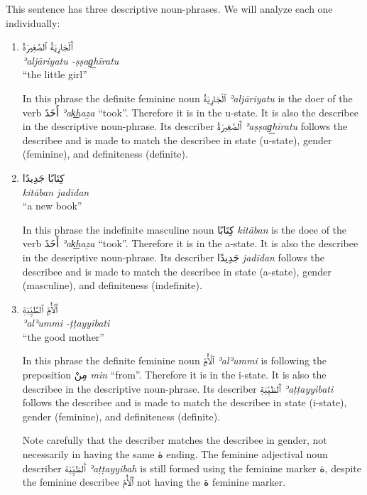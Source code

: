 \documentclass[
  10pt,
]{book}
\begin{document}
This sentence has three descriptive noun-phrases. We will analyze each one individually:

\begin{enumerate}
\def\labelenumi{\roman{enumi}.}
\item
  \foreignlanguage{arabic}{ٱَلْجَارِيَةُ ٱلصَّغِيرَةُ}\\
  \emph{ʾaljāriyatu -ṣṣag͟hīratu}\\
  \enquote{the little girl}

  In this phrase the definite feminine noun \foreignlanguage{arabic}{ٱلْجَارِيَةُ} \emph{ʾaljāriyatu} is the doer of the verb \foreignlanguage{arabic}{أَخَذَ} \emph{ʾak͟haẕa} \enquote{took}. Therefore it is in the u-state. It is also the describee in the descriptive noun-phrase. Its describer \foreignlanguage{arabic}{ٱَلصَّغِيرَةُ} \emph{ʾaṣṣag͟hīratu} follows the describee and is made to match the describee in state (u-state), gender (feminine), and definiteness (definite).
\item
  \foreignlanguage{arabic}{کِتَابًا جَدِيدًا}\\
  \emph{kitāban jadīdan}\\
  \enquote{a new book}

  In this phrase the indefinite masculine noun \foreignlanguage{arabic}{کِتَابًا} \emph{kitāban} is the doee of the verb \foreignlanguage{arabic}{أَخَذَ} \emph{ʾak͟haẕa} \enquote{took}. Therefore it is in the a-state. It is also the describee in the descriptive noun-phrase. Its describer \foreignlanguage{arabic}{جَدِيدًا} \emph{jadīdan} follows the describee and is made to match the describee in state (a-state), gender (masculine), and definiteness (indefinite).
\item
  \foreignlanguage{arabic}{ٱَلْأُمِّ ٱلطَّيِّبَةِ}\\
  \emph{ʾalʾummi -ṭṭayyibati}\\
  \enquote{the good mother}

  In this phrase the definite feminine noun \foreignlanguage{arabic}{ٱلْأُمِّ} \emph{ʾalʾummi} is following the preposition \foreignlanguage{arabic}{مِنْ} \emph{min} \enquote{from}. Therefore it is in the i-state. It is also the describee in the descriptive noun-phrase. Its describer \foreignlanguage{arabic}{ٱَلطَيِّبَةِ} \emph{ʾaṭṭayyibati} follows the describee and is made to match the describee in state (i-state), gender (feminine), and definiteness (definite).

  Note carefully that the describer matches the describee in gender, not necessarily in having the same \foreignlanguage{arabic}{ة} ending. The feminine adjectival noun describer \foreignlanguage{arabic}{ٱَلطَيِّبَة} \emph{ʾaṭṭayyibah} is still formed using the feminine marker \foreignlanguage{arabic}{ة}, despite the feminine describee \foreignlanguage{arabic}{ٱَلْأُمّ} not having the \foreignlanguage{arabic}{ة} feminine marker.
\end{enumerate}
\end{document}
